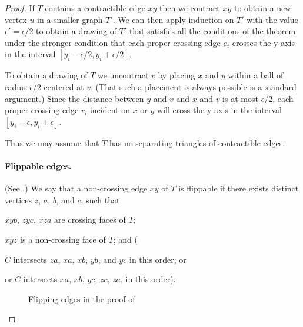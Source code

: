 \documentclass{patmorin}
\begin{document}
\begin{proof}
   If $T$ contains a contractible edge $xy$ then we contract $xy$ to
   obtain a new vertex $u$ in a smaller graph $T'$.   We can then apply
   induction on $T'$ with the value $\epsilon'=\epsilon/2$ to obtain a
   drawing of $T'$ that satisfies all the conditions of the theorem under
   the stronger condition that each proper crossing edge $e_i$ crosses
   the y-axis in the interval $[y_i-\epsilon/2,y_i+\epsilon/2]$.

   To obtain a drawing of $T$ we uncontract $v$ by placing $x$ and $y$
   within a ball of radius $\epsilon/2$ centered at $v$. (That such
   a placement is always possible is a standard argument.)  Since the
   distance between $y$ and $v$ and $x$ and $v$ is at most $\epsilon/2$,
   each proper crossing edge $r_i$ incident on $x$ or $y$ will cross
   the y-axis in the interval $[y_i-\epsilon,y_i+\epsilon]$.

   Thus we may assume that $T$ has no separating triangles of contractible
   edges.


   \paragraph{Flippable edges.}
   (See .)
   We say that a non-crossing edge $xy$ of $T$ is flippable if there
   exists distinct vertices $z$, $a$, $b$, and $c$, such that 
   \begin{compactenum}
      \item $xyb$, $zyc$, $xza$ are crossing faces of $T$;
      \item $xyz$ is a non-crossing face of $T$; and (
      \item $C$ intersects $za$, $xa$, $xb$, $yb$, and $yc$ in this order; or 
      \item or $C$ intersects $xa$, $xb$, $yc$, $zc$, $za$, in this order).  
   \end{compactenum}
   \begin{figure}
      \caption{Flipping edges in the proof of
      }
   \end{figure}


\end{proof}
\end{document}
